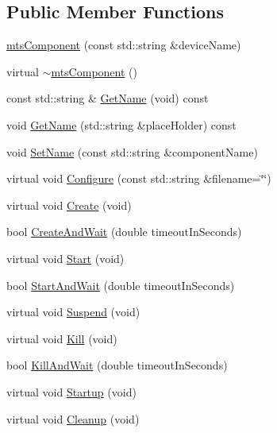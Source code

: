 \subsection*{Public Member Functions}
\begin{DoxyCompactItemize}
\item 
\hyperlink{classmts_component_ac465bee698692fda1ed1b473961a7daf}{mts\+Component} (const std\+::string \&device\+Name)
\item 
virtual \hyperlink{classmts_component_ad9bddad895d74bb29d193e4ce8f00a72}{$\sim$mts\+Component} ()
\item 
const std\+::string \& \hyperlink{classmts_component_aafd5586590dbc734cd48159907d716da}{Get\+Name} (void) const 
\item 
void \hyperlink{classmts_component_ab52b677b49c90557944a3d09dcc433a8}{Get\+Name} (std\+::string \&place\+Holder) const 
\item 
void \hyperlink{classmts_component_adf1bfb6381d23dc9b771d614e64ab65d}{Set\+Name} (const std\+::string \&component\+Name)
\item 
virtual void \hyperlink{classmts_component_ad872432876de7879dc96c232b411c146}{Configure} (const std\+::string \&filename=\char`\"{}\char`\"{})
\item 
virtual void \hyperlink{classmts_component_a7e8a723ce2fa2ed12b2fb4095ca6feec}{Create} (void)
\item 
bool \hyperlink{classmts_component_a143bee124e9caf72db28dc453da7d9f1}{Create\+And\+Wait} (double timeout\+In\+Seconds)
\item 
virtual void \hyperlink{classmts_component_abfb4a63739ec45a9cdb91e3363db7c5c}{Start} (void)
\item 
bool \hyperlink{classmts_component_a2d9a0ec39e9dda62891234cab5c4f387}{Start\+And\+Wait} (double timeout\+In\+Seconds)
\item 
virtual void \hyperlink{classmts_component_a7264642eb5c56729d1f80263e0e1152b}{Suspend} (void)
\item 
virtual void \hyperlink{classmts_component_a8c874182b54438abb963b755c3b27f95}{Kill} (void)
\item 
bool \hyperlink{classmts_component_a35f743f82339df699b5939dfbb724677}{Kill\+And\+Wait} (double timeout\+In\+Seconds)
\item 
virtual void \hyperlink{classmts_component_aaf28f0262b44eb6866e10089a02fa6e4}{Startup} (void)
\item 
virtual void \hyperlink{classmts_component_a891f330f4fde7d831dcf7dc537dc5e81}{Cleanup} (void)
\item 

\end{DoxyCompactItemize}
